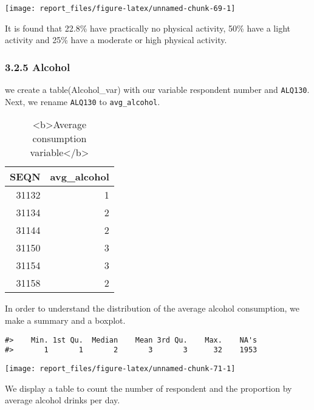 \documentclass[
]{article}
\begin{document}
\begin{center}\texttt{[image: report\_files/figure-latex/unnamed-chunk-69-1]} \end{center}

It is found that 22.8\% have practically no physical activity, 50\% have
a light activity and 25\% have a moderate or high physical activity.

\hypertarget{alcohol}{%
\subsubsection{3.2.5 Alcohol}\label{alcohol}}

we create a table(Alcohol\_var) with our variable respondent number and
\texttt{ALQ130}. Next, we rename \texttt{ALQ130} to
\texttt{avg\_alcohol}.

\begin{table}

\caption{\label{tab:unnamed-chunk-70}<b>Average consumption variable</b>}
\centering
\begin{tabular}[t]{r|r}
\hline
SEQN & avg\_alcohol\\
\hline
31132 & 1\\
\hline
31134 & 2\\
\hline
31144 & 2\\
\hline
31150 & 3\\
\hline
31154 & 3\\
\hline
31158 & 2\\
\hline
\end{tabular}
\end{table}

In order to understand the distribution of the average alcohol
consumption, we make a summary and a boxplot.

\begin{verbatim}
#>    Min. 1st Qu.  Median    Mean 3rd Qu.    Max.    NA's 
#>       1       1       2       3       3      32    1953
\end{verbatim}

\begin{center}\texttt{[image: report\_files/figure-latex/unnamed-chunk-71-1]} \end{center}

We display a table to count the number of respondent and the proportion
by average alcohol drinks per day.
\end{document}

